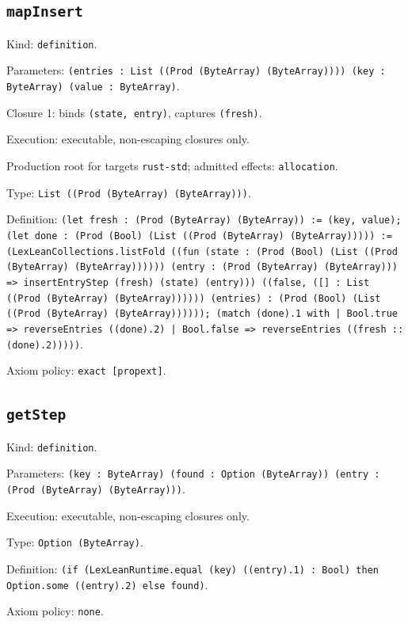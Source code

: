 \documentclass[11pt]{article}
\begin{document}
\subsection*{\texttt{mapInsert}}
\noindent Kind: \texttt{definition}.\par
\noindent Parameters: \texttt{(entries : List ((Prod (ByteArray) (ByteArray)))) (key : ByteArray) (value : ByteArray)}.\par
\noindent Closure 1: binds \texttt{(state, entry)}, captures \texttt{(fresh)}.\par
\noindent Execution: executable, non-escaping closures only.\par
\noindent Production root for targets \texttt{rust-std}; admitted effects: \texttt{allocation}.\par
\noindent Type: \texttt{List ((Prod (ByteArray) (ByteArray)))}.\par
\noindent Definition: \texttt{(let fresh : (Prod (ByteArray) (ByteArray)) := (key, value); (let done : (Prod (Bool) (List ((Prod (ByteArray) (ByteArray))))) := (LexLeanCollections.listFold ((fun (state : (Prod (Bool) (List ((Prod (ByteArray) (ByteArray)))))) (entry : (Prod (ByteArray) (ByteArray))) => insertEntryStep (fresh) (state) (entry))) ((false, ([] : List ((Prod (ByteArray) (ByteArray)))))) (entries) : (Prod (Bool) (List ((Prod (ByteArray) (ByteArray)))))); (match (done).1 with | Bool.true => reverseEntries ((done).2) | Bool.false => reverseEntries ((fresh :: (done).2)))))}.\par
\noindent Axiom policy: \texttt{exact [propext]}.\par
\subsection*{\texttt{getStep}}
\noindent Kind: \texttt{definition}.\par
\noindent Parameters: \texttt{(key : ByteArray) (found : Option (ByteArray)) (entry : (Prod (ByteArray) (ByteArray)))}.\par
\noindent Execution: executable, non-escaping closures only.\par
\noindent Type: \texttt{Option (ByteArray)}.\par
\noindent Definition: \texttt{(if (LexLeanRuntime.equal (key) ((entry).1) : Bool) then Option.some ((entry).2) else found)}.\par
\noindent Axiom policy: \texttt{none}.\par
\end{document}
